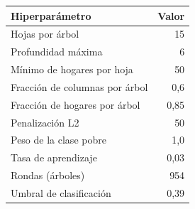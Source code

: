 \begin{tabular}{lr}
\toprule
\textbf{Hiperparámetro} & \textbf{Valor} \\
\midrule
Hojas por árbol & 15 \\
Profundidad máxima & 6 \\
Mínimo de hogares por hoja & 50 \\
Fracción de columnas por árbol & 0,6 \\
Fracción de hogares por árbol & 0,85 \\
Penalización L2 & 50 \\
Peso de la clase pobre & 1,0 \\
Tasa de aprendizaje & 0,03 \\
Rondas (árboles) & 954 \\
Umbral de clasificación & 0,39 \\
\bottomrule
\end{tabular}
